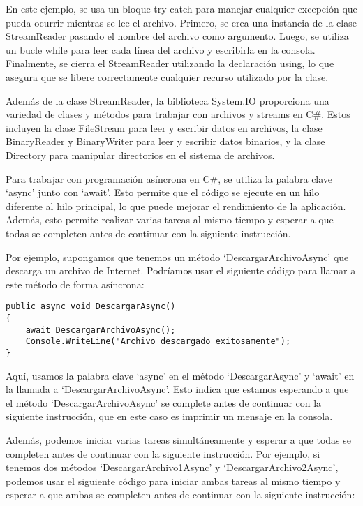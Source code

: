 \documentclass[executivepaper]{article}
\begin{document}
En este ejemplo, se usa un bloque try-catch para manejar cualquier excepción que pueda ocurrir mientras se lee el archivo. Primero, se crea una instancia de la clase StreamReader pasando el nombre del archivo como argumento. Luego, se utiliza un bucle while para leer cada línea del archivo y escribirla en la consola. Finalmente, se cierra el StreamReader utilizando la declaración using, lo que asegura que se libere correctamente cualquier recurso utilizado por la clase.

Además de la clase StreamReader, la biblioteca System.IO proporciona una variedad de clases y métodos para trabajar con archivos y streams en C\#. Estos incluyen la clase FileStream para leer y escribir datos en archivos, la clase BinaryReader y BinaryWriter para leer y escribir datos binarios, y la clase Directory para manipular directorios en el sistema de archivos.


Para trabajar con programación asíncrona en C\#, se utiliza la palabra clave \enquote*{async} junto con \enquote*{await}. Esto permite que el código se ejecute en un hilo diferente al hilo principal, lo que puede mejorar el rendimiento de la aplicación. Además, esto permite realizar varias tareas al mismo tiempo y esperar a que todas se completen antes de continuar con la siguiente instrucción.

Por ejemplo, supongamos que tenemos un método \enquote*{DescargarArchivoAsync} que descarga un archivo de Internet. Podríamos usar el siguiente código para llamar a este método de forma asíncrona:

\begin{lstlisting}
public async void DescargarAsync()
{
    await DescargarArchivoAsync();
    Console.WriteLine("Archivo descargado exitosamente");
}
\end{lstlisting}

Aquí, usamos la palabra clave \enquote*{async} en el método \enquote*{DescargarAsync} y \enquote*{await} en la llamada a \enquote*{DescargarArchivoAsync}. Esto indica que estamos esperando a que el método \enquote*{DescargarArchivoAsync} se complete antes de continuar con la siguiente instrucción, que en este caso es imprimir un mensaje en la consola.

Además, podemos iniciar varias tareas simultáneamente y esperar a que todas se completen antes de continuar con la siguiente instrucción. Por ejemplo, si tenemos dos métodos \enquote*{DescargarArchivo1Async} y \enquote*{DescargarArchivo2Async}, podemos usar el siguiente código para iniciar ambas tareas al mismo tiempo y esperar a que ambas se completen antes de continuar con la siguiente instrucción:
\end{document}
